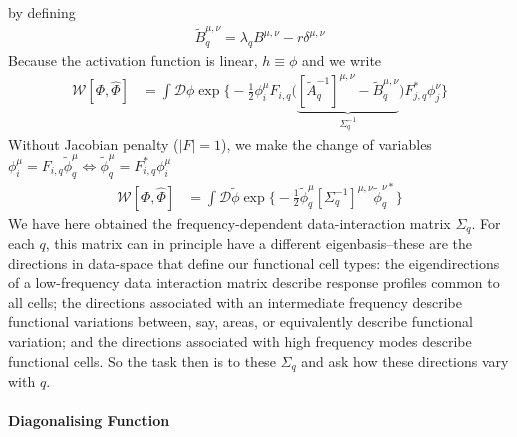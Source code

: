 \documentclass[../main.tex]{subfiles}
\begin{document}
by defining
\begin{align*}
    \tilde B^{\mu,\nu}_q = \lambda_q B^{\mu,\nu} - r \delta^{\mu,\nu}
\end{align*}
Because the activation function is linear, $h \equiv \phi$ and we write
\begin{align*}
  \mathcal W[\Phi, \hat \Phi]
  &= 
  \int \mathcal{D} \phi \exp \Bigg \{
    - \frac12 \phi^{\mu}_i 
         F_{i,q}
         \Big(
            \underbrace{ 
                [\tilde A_q^{-1}]^{\mu,\nu}
                - \tilde B^{\mu,\nu}_q
            }_{\Sigma^{-1}_q}
        \Big)
        F^*_{j,q}
    \phi^{\nu}_j 
  \Bigg \}
\end{align*}
Without Jacobian penalty ($|F|=1$), we make the change of variables $\phi^{\mu}_i = F_{i,q} \tilde \phi^{\mu}_q \Leftrightarrow \tilde \phi^{\mu}_q = F^{*}_{i,q} \phi^{\mu}_i$
\begin{align*}
  \mathcal W[\Phi, \hat \Phi]
  &= 
  \int \mathcal{D} \tilde \phi \exp \Bigg \{
    - \frac12 \tilde \phi^{\mu}_q 
         [\Sigma^{-1}_q]^{\mu,\nu}
    \tilde \phi^{\nu *}_q 
  \Bigg \}
\end{align*}
We have here obtained the frequency-dependent data-interaction matrix $\Sigma_q$. For each $q$, this matrix can in principle have a different eigenbasis--these are the directions in data-space that define our functional cell types: the eigendirections of a low-frequency data interaction matrix describe response profiles common to all cells; the directions associated with an intermediate frequency describe functional variations between, say, areas, or equivalently describe  functional variation; and the directions associated with high frequency modes describe functional cells. So the task then is to  these $\Sigma_q$ and ask how these directions vary with $q$.

\paragraph{Diagonalising Function}
\end{document}
